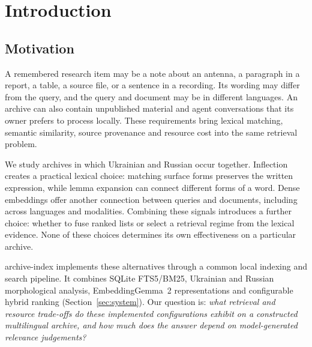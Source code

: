 \section{Introduction}\label{sec:intro}

\subsection{Motivation}
A remembered research item may be a note about an antenna, a paragraph in a report, a table, a source file, or a sentence in a recording. Its wording may differ from the query, and the query and document may be in different languages. An archive can also contain unpublished material and agent conversations that its owner prefers to process locally. These requirements bring lexical matching, semantic similarity, source provenance and resource cost into the same retrieval problem.

We study archives in which Ukrainian and Russian occur together. Inflection creates a practical lexical choice: matching surface forms preserves the written expression, while lemma expansion can connect different forms of a word. Dense embeddings offer another connection between queries and documents, including across languages and modalities. Combining these signals introduces a further choice: whether to fuse ranked lists or select a retrieval regime from the lexical evidence. None of these choices determines its own effectiveness on a particular archive.

archive-index implements these alternatives through a common local indexing and search pipeline. It combines SQLite FTS5/BM25, Ukrainian and Russian morphological analysis, EmbeddingGemma~2 representations and configurable hybrid ranking (Section~\ref{sec:system}). Our question is: \emph{what retrieval and resource trade-offs do these implemented configurations exhibit on a constructed multilingual archive, and how much does the answer depend on model-generated relevance judgements?}

